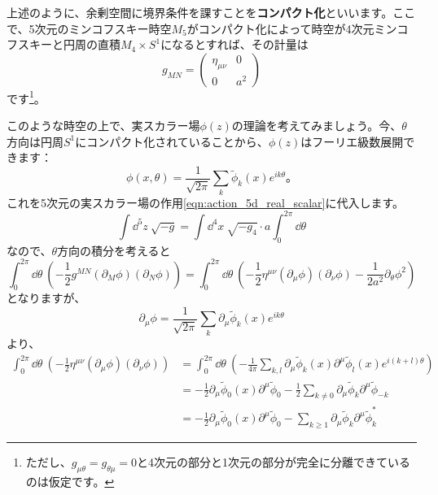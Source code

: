 \documentclass[unicode,a4paper,11pt]{ltjsarticle}
\begin{document}
上述のように、余剰空間に境界条件を課すことを\textbf{コンパクト化}といいます。ここで、5次元のミンコフスキー時空$M_{5}$がコンパクト化によって時空が4次元ミンコフスキーと円周の直積$M_{4}\times S^{1}$になるとすれば、その計量は
\begin{equation}
   g_{MN}
   =
   \begin{pmatrix}
      \eta_{\mu\nu} & 0   \\
      0             & a^2
   \end{pmatrix}
\end{equation}
です\footnote{
ただし、$g_{\mu\theta}=g_{\theta\mu}=0$と4次元の部分と1次元の部分が完全に分離できているのは仮定です。
}。

このような時空の上で、実スカラー場$\phi(z)$の理論を考えてみましょう。今、$\theta$方向は円周$S^{1}$にコンパクト化されていることから、$\phi(z)$はフーリエ級数展開できます：
\begin{equation}
   \phi(x,\theta)
   =
   \frac{1}{\sqrt{2\pi}}
   \sum_{k}\tilde{\phi}_{k}(x)e^{ik\theta}
   \text{。}
\end{equation}
これを5次元の実スカラー場の作用\eqref{eqn:action_5d_real_scalar}に代入します。
\begin{equation}
   \int\dd^5 z\
   \sqrt{-g}
   =
   \int\dd^4 x\ \sqrt{-g_{4}}
   \cdot
   a\int_{0}^{2\pi}\dd \theta
\end{equation}
なので、$\theta$方向の積分を考えると
\begin{equation}
   \int_{0}^{2\pi}\dd \theta\
   \left(
   -\frac{1}{2}g^{MN}(\partial_{M}\phi)(\partial_{N}\phi)
   \right)
   =
   \int_{0}^{2\pi}\dd \theta\
   \left(
   -
   \frac{1}{2}\eta^{\mu\nu}(\partial_{\mu}\phi)(\partial_{\nu}\phi)
   -
   \frac{1}{2a^2}\partial_{\theta}\phi^2
   \right)
   \label{eqn:2_1}
\end{equation}
となりますが、
\begin{equation}
   \partial_{\mu}\phi
   =
   \frac{1}{\sqrt{2\pi}}
   \sum_{k}\partial_{\mu}\tilde{\phi}_{k}(x)e^{ik\theta}
\end{equation}
より、
\begin{align}
   \int_{0}^{2\pi}\dd \theta\
   \left(
   -
   \frac{1}{2}\eta^{\mu\nu}(\partial_{\mu}\phi)(\partial_{\nu}\phi)
   \right)
    & =
   \int_{0}^{2\pi}\dd \theta\
   \left(
   -\frac{1}{4\pi}\sum_{k,l}\partial_{\mu}\tilde{\phi}_{k}(x)\partial^{\mu}\tilde{\phi}_{l}(x)e^{i(k+l)\theta}
   \right)
   \nonumber
   \\
    & =
   -\frac{1}{2}\partial_{\mu}\tilde{\phi}_{0}(x)\partial^{\mu}\tilde{\phi}_{0}
   -\frac{1}{2}\sum_{k\neq 0}\partial_{\mu}\tilde{\phi}_{k}\partial^{\mu}\tilde{\phi}_{-k}
   \nonumber
   \\
    & =
   -\frac{1}{2}\partial_{\mu}\tilde{\phi}_{0}(x)\partial^{\mu}\tilde{\phi}_{0}
   -\sum_{k\geq 1}\partial_{\mu}\tilde{\phi}_{k}\partial^{\mu}\tilde{\phi}_{k}^{\ast}
\end{align}
\end{document}
